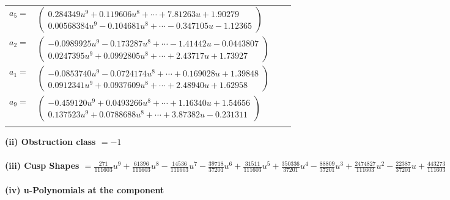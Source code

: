\documentclass[1p]{elsarticle_modified}
\theoremstyle{definition}
\begin{document}
\begin{tabular}{m{7pt} m{180pt} m{7pt} m{180pt} }
\flushright $a_{5}=$&$\begin{pmatrix}0.284349 u^{9}+0.119606 u^{8}+\cdots+7.81263 u+1.90279\\0.00568384 u^{9}-0.104681 u^{8}+\cdots-0.347105 u-1.12365\end{pmatrix}$ \\
\flushright $a_{2}=$&$\begin{pmatrix}-0.0989925 u^{9}-0.173287 u^{8}+\cdots-1.41442 u-0.0443807\\0.0247395 u^{9}+0.0992805 u^{8}+\cdots+2.43717 u+1.73927\end{pmatrix}$ \\
\flushright $a_{1}=$&$\begin{pmatrix}-0.0853740 u^{9}-0.0724174 u^{8}+\cdots+0.169028 u+1.39848\\0.0912341 u^{9}+0.0937609 u^{8}+\cdots+2.48940 u+1.62958\end{pmatrix}$ \\
\flushright $a_{9}=$&$\begin{pmatrix}-0.459120 u^{9}+0.0493266 u^{8}+\cdots+1.16340 u+1.54656\\0.137523 u^{9}+0.0788688 u^{8}+\cdots+3.87382 u-0.231311\end{pmatrix}$\\&\end{tabular}
\flushleft \textbf{(ii) Obstruction class $= -1$}\\~\\
\flushleft \textbf{(iii) Cusp Shapes $= \frac{271}{111603} u^9+\frac{61396}{111603} u^8-\frac{14536}{111603} u^7-\frac{39718}{37201} u^6+\frac{31511}{111603} u^5+\frac{350336}{37201} u^4-\frac{88809}{37201} u^3+\frac{2474827}{111603} u^2-\frac{22387}{37201} u+\frac{443273}{111603}$}\\~\\
\newpage\renewcommand{\arraystretch}{1}
\flushleft \textbf{(iv) u-Polynomials at the component}\newline \\
\end{document}
